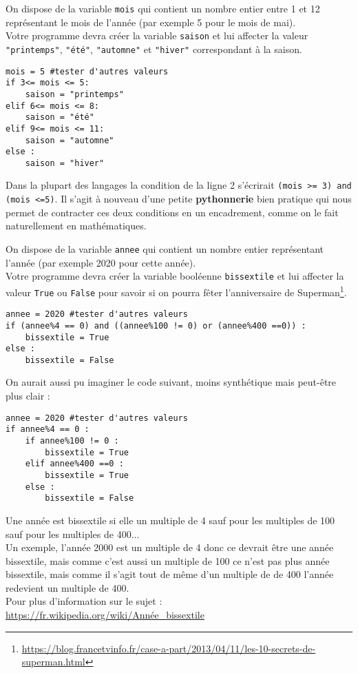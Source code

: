 \begin{cor}[Python (*)]
\begin{multicols}{2}
On dispose de la variable \texttt{mois} qui contient un nombre entier entre 1 et 12 représentant le mois de l'année (par exemple 5 pour le mois de mai).\\
Votre programme devra créer la variable \texttt{saison} et lui affecter la valeur \texttt{"printemps"}, \texttt{"été"}, \texttt{"automne"} et \texttt{"hiver"} correspondant à la saison.\\
\columnbreak
\begin{lstlisting}
mois = 5 #tester d'autres valeurs
if 3<= mois <= 5:
	saison = "printemps"
elif 6<= mois <= 8:
	saison = "été"
elif 9<= mois <= 11:
	saison = "automne"
else :
	saison = "hiver"
\end{lstlisting}
\end{multicols}
\begin{rem}
Dans la plupart des langages la condition de la ligne 2 s'écrirait \texttt{(mois >= 3) and (mois <=5)}. Il s'agit à nouveau d'une petite \textbf{pythonnerie} bien pratique qui nous permet de contracter ces deux conditions en un encadrement, comme on le fait naturellement en mathématiques.   
\end{rem}
\end{cor}

\newpage
\begin{cor}[Python (**)]
On dispose de la variable \texttt{annee} qui contient un nombre entier représentant l'année (par exemple 2020 pour cette année).\\
Votre programme devra créer la variable booléenne \texttt{bissextile} et lui affecter la valeur \texttt{True} ou \texttt{False} pour savoir si on pourra fêter l'anniversaire de Superman\footnote{\url{https://blog.francetvinfo.fr/case-a-part/2013/04/11/les-10-secrets-de-superman.html}}.\begin{lstlisting}
annee = 2020 #tester d'autres valeurs
if (annee%4 == 0) and ((annee%100 != 0) or (annee%400 ==0)) :
	bissextile = True
else :
	bissextile = False
\end{lstlisting}
On aurait aussi pu imaginer le code suivant, moins synthétique mais peut-être plus clair :
\begin{lstlisting}
annee = 2020 #tester d'autres valeurs
if annee%4 == 0 :
	if annee%100 != 0 :
		bissextile = True
	elif annee%400 ==0 :
		bissextile = True
	else :
		bissextile = False
\end{lstlisting}
\begin{rem}
Une année est bissextile si elle un multiple de 4 sauf pour les multiples de 100 sauf pour les multiples de 400...\\
Un exemple, l'année 2000 est un multiple de 4 donc ce devrait être une année bissextile, mais comme c'est aussi un multiple de 100 ce n'est pas plus année bissextile, mais comme il s'agit tout de même d'un multiple de de 400 l'année redevient un multiple de 400.\\
Pour plus d'information sur le sujet :\\
\url{https://fr.wikipedia.org/wiki/Année_bissextile}
\end{rem}
\end{cor}




